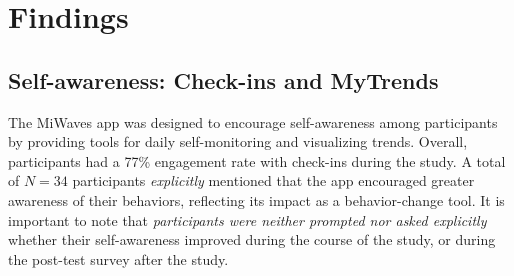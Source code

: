 
\section{Findings}
\label{sec:findings}
\subsection{Self-awareness: Check-ins and MyTrends}
The MiWaves app was designed to encourage self-awareness among participants by providing tools for daily self-monitoring and visualizing trends. 
Overall, participants had a 77\% engagement rate with check-ins during the study.
A total of $N=34$ participants \emph{explicitly} mentioned that the app encouraged greater awareness of their behaviors, reflecting its impact as a behavior-change tool. It is important to note that \emph{participants were neither prompted nor asked explicitly} whether their self-awareness improved during the course of the study, or during the post-test survey after the study.


